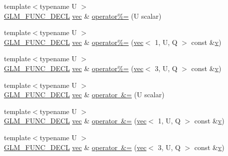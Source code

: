 \begin{DoxyCompactItemize}
\item 
{\footnotesize template$<$typename U $>$ }\\\mbox{\hyperlink{setup_8hpp_ab2d052de21a70539923e9bcbf6e83a51}{G\+L\+M\+\_\+\+F\+U\+N\+C\+\_\+\+D\+E\+CL}} \mbox{\hyperlink{structglm_1_1vec}{vec}} \& \mbox{\hyperlink{structglm_1_1vec_3_013_00_01_t_00_01_q_01_4_a829ac327596dab68cb82ec753871dabb}{operator\%=}} (U scalar)
\item 
{\footnotesize template$<$typename U $>$ }\\\mbox{\hyperlink{setup_8hpp_ab2d052de21a70539923e9bcbf6e83a51}{G\+L\+M\+\_\+\+F\+U\+N\+C\+\_\+\+D\+E\+CL}} \mbox{\hyperlink{structglm_1_1vec}{vec}} \& \mbox{\hyperlink{structglm_1_1vec_3_013_00_01_t_00_01_q_01_4_a6be535e570c0bf961ffe15426bdca592}{operator\%=}} (\mbox{\hyperlink{structglm_1_1vec}{vec}}$<$ 1, U, Q $>$ const \&\mbox{\hyperlink{_s_d_l__opengl_8h_a10a82eabcb59d2fcd74acee063775f90}{v}})
\item 
{\footnotesize template$<$typename U $>$ }\\\mbox{\hyperlink{setup_8hpp_ab2d052de21a70539923e9bcbf6e83a51}{G\+L\+M\+\_\+\+F\+U\+N\+C\+\_\+\+D\+E\+CL}} \mbox{\hyperlink{structglm_1_1vec}{vec}} \& \mbox{\hyperlink{structglm_1_1vec_3_013_00_01_t_00_01_q_01_4_a60aee54fdff3fb07eb2a58f95c9690c5}{operator\%=}} (\mbox{\hyperlink{structglm_1_1vec}{vec}}$<$ 3, U, Q $>$ const \&\mbox{\hyperlink{_s_d_l__opengl_8h_a10a82eabcb59d2fcd74acee063775f90}{v}})
\item 
{\footnotesize template$<$typename U $>$ }\\\mbox{\hyperlink{setup_8hpp_ab2d052de21a70539923e9bcbf6e83a51}{G\+L\+M\+\_\+\+F\+U\+N\+C\+\_\+\+D\+E\+CL}} \mbox{\hyperlink{structglm_1_1vec}{vec}} \& \mbox{\hyperlink{structglm_1_1vec_3_013_00_01_t_00_01_q_01_4_a53ed94a1a8c5d6e72de59460b96ac122}{operator \&=}} (U scalar)
\item 
{\footnotesize template$<$typename U $>$ }\\\mbox{\hyperlink{setup_8hpp_ab2d052de21a70539923e9bcbf6e83a51}{G\+L\+M\+\_\+\+F\+U\+N\+C\+\_\+\+D\+E\+CL}} \mbox{\hyperlink{structglm_1_1vec}{vec}} \& \mbox{\hyperlink{structglm_1_1vec_3_013_00_01_t_00_01_q_01_4_a4004b269d4ba52855467734b9acbad9f}{operator \&=}} (\mbox{\hyperlink{structglm_1_1vec}{vec}}$<$ 1, U, Q $>$ const \&\mbox{\hyperlink{_s_d_l__opengl_8h_a10a82eabcb59d2fcd74acee063775f90}{v}})
\item 
{\footnotesize template$<$typename U $>$ }\\\mbox{\hyperlink{setup_8hpp_ab2d052de21a70539923e9bcbf6e83a51}{G\+L\+M\+\_\+\+F\+U\+N\+C\+\_\+\+D\+E\+CL}} \mbox{\hyperlink{structglm_1_1vec}{vec}} \& \mbox{\hyperlink{structglm_1_1vec_3_013_00_01_t_00_01_q_01_4_ab9bb5a0a46b3788c7ddfef17b53bae95}{operator \&=}} (\mbox{\hyperlink{structglm_1_1vec}{vec}}$<$ 3, U, Q $>$ const \&\mbox{\hyperlink{_s_d_l__opengl_8h_a10a82eabcb59d2fcd74acee063775f90}{v}})

\end{DoxyCompactItemize}
